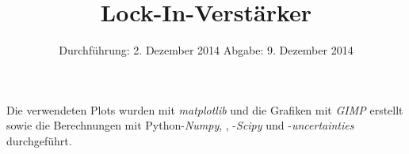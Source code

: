 
\usepackage{marvosym}
\subject{Anfängerpraktikum V303}
\title{Lock-In-Verstärker
}
\date{
  Durchführung: 2. Dezember 2014
  \hspace{1em}
  Abgabe: 9. Dezember 2014
}


\maketitle
\thispagestyle{empty}
\newpage





\printbibliography
\noindent Die verwendeten Plots wurden mit \textit{matplotlib}\cite{matplotlib} und die Grafiken mit \textit{GIMP}\cite{gimp} erstellt sowie die Berechnungen mit Python-\textit{Numpy}, \cite{numpy}, -\textit{Scipy}\cite{scipy} und -\textit{uncertainties}\cite{uncertainties} durchgeführt.

